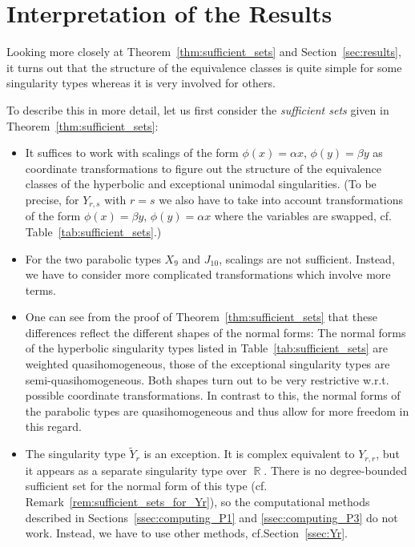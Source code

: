 \documentclass{amsproc}
\theoremstyle{definition}
\newcommand{\tY}{\widetilde{Y}}
\DeclareMathOperator{\R}{\mathbb{R}}
\begin{document}
\section{Interpretation of the Results}\label{sec:interpretation}

Looking more closely at Theorem~\ref{thm:sufficient_sets} and
Section~\ref{sec:results}, it turns out that the structure of the equivalence
classes is quite simple for some singularity types whereas it is very involved
for others.

To describe this in more detail, let us first consider the \emph{sufficient
sets} given in Theorem~\ref{thm:sufficient_sets}:
\begin{itemize}
\item
It suffices to work with scalings of the form $\phi(x) = \alpha x$,
$\phi(y) = \beta y$ as coordinate transformations to figure out the structure
of the equivalence classes of the hyperbolic and exceptional unimodal
singularities. (To be precise, for $Y_{r,s}$ with $r = s$ we also have to take
into account transformations of the form $\phi(x) = \beta y$,
$\phi(y) = \alpha x$ where the variables are swapped, cf.\@
Table~\ref{tab:sufficient_sets}.)
\item
For the two parabolic types $X_9$ and $J_{10}$, scalings are not sufficient.
Instead, we have to consider more complicated transformations which involve
more terms.
\item
One can see from the proof of Theorem~\ref{thm:sufficient_sets} that these
differences reflect the different shapes of the normal forms: The normal forms
of the hyperbolic singularity types listed in Table~\ref{tab:sufficient_sets}
are weighted quasihomogeneous, those of the exceptional singularity types are
semi-quasihomogeneous. Both shapes turn out to be very restrictive w.r.t.\@
possible coordinate transformations. In contrast to this, the normal forms of
the parabolic types are quasihomogeneous and thus allow for more freedom in
this regard.
\item
The singularity type $\tY_r$ is an exception. It is complex equivalent to
$Y_{r,r}$, but it appears as a separate singularity type over $\R$. There is no
degree-bounded sufficient set for the normal form of this type (cf.\@
Remark~\ref{rem:sufficient_sets_for_Yr}), so the computational methods
described in Sections~\ref{ssec:computing_P1} and \ref{ssec:computing_P3} do
not work. Instead, we have to use other methods, cf.\@ Section~\ref{ssec:Yr}.
\end{itemize}
\end{document}
